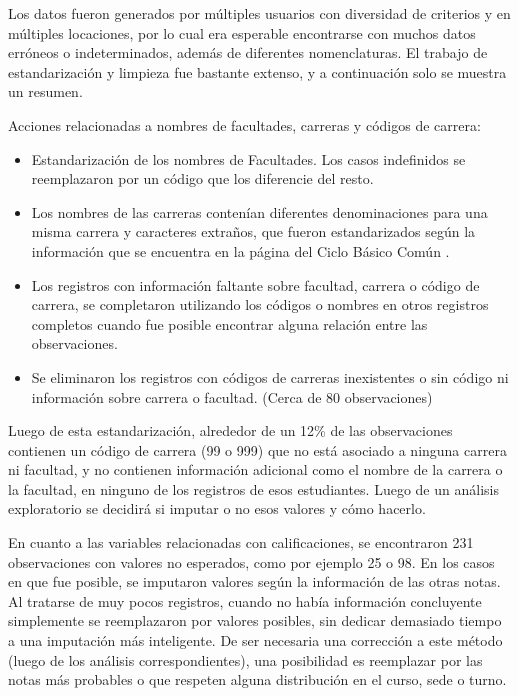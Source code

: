 \documentclass[a4paper,11pt,dvipsnames]{article}
\begin{document}
Los datos fueron generados por múltiples usuarios con diversidad de criterios y en múltiples locaciones, por lo cual era esperable encontrarse con muchos datos erróneos o indeterminados, además de diferentes nomenclaturas. El trabajo de estandarización y limpieza fue bastante extenso, y a continuación solo se muestra un resumen.\par\medskip

Acciones relacionadas a nombres de facultades, carreras y códigos de carrera:
\begin{itemize}
    \item Estandarización de los nombres de Facultades. Los casos indefinidos se reemplazaron por un código que los diferencie del resto.
    \item Los nombres de las carreras contenían diferentes denominaciones para una misma carrera y caracteres extraños, que fueron estandarizados según la información que se encuentra en la página del Ciclo Básico Común \cite{cbc:carreras}.
    \item Los registros con información faltante sobre facultad, carrera o código de carrera, se completaron utilizando los códigos o nombres en otros registros completos cuando fue posible encontrar alguna relación entre las observaciones.
    \item Se eliminaron los registros con códigos de carreras inexistentes o sin código ni información sobre carrera o facultad. (Cerca de 80 observaciones)
\end{itemize}

Luego de esta estandarización, alrededor de un 12\% de las observaciones contienen un código de carrera (99 o 999) que no está asociado a ninguna carrera ni facultad, y no contienen información adicional como el nombre de la carrera o la facultad, en ninguno de los registros de esos estudiantes. Luego de un análisis exploratorio se decidirá si imputar o no esos valores y cómo hacerlo.\par\medskip

En cuanto a las variables relacionadas con calificaciones, se encontraron 231 observaciones con valores no esperados, como por ejemplo 25 o 98. En los casos en que fue posible, se imputaron valores según la información de las otras notas. Al tratarse de muy pocos registros, cuando no había información concluyente simplemente se reemplazaron por valores posibles, sin dedicar demasiado tiempo a una imputación más inteligente. De ser necesaria una corrección a este método (luego de los análisis correspondientes), una posibilidad es reemplazar por las notas más probables o que respeten alguna distribución en el curso, sede o turno.\par\medskip
\end{document}
